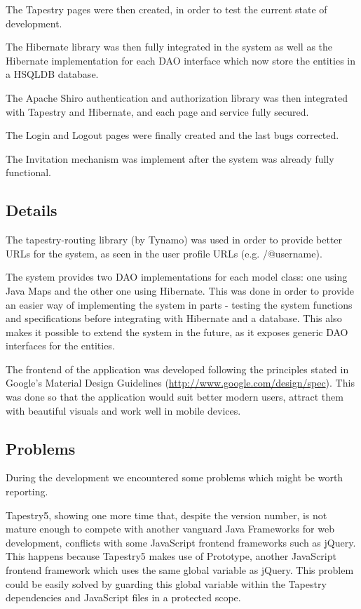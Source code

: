 \documentclass[paper=a4, fontsize=12pt]{scrartcl}
\numberwithin{equation}{section}    %
\numberwithin{figure}{section}      %
\numberwithin{table}{section}        %
\begin{document}
The Tapestry pages were then created, in order to test the current state of development.

The Hibernate library was then fully integrated in the system as well as the Hibernate
implementation for each DAO interface which now store the entities in a HSQLDB database.

The Apache Shiro authentication and authorization library was then integrated with Tapestry and Hibernate,
and each page and service fully secured.

The Login and Logout pages were finally created and the last bugs corrected.

The Invitation mechanism was implement after the system was already fully functional.

\subsection{Details}
The tapestry-routing library (by Tynamo) was used in order to provide better URLs for the system,
as seen in the user profile URLs (e.g. /@username).

The system provides two DAO implementations for each model class: one using Java Maps
and the other one using Hibernate. This was done in order to provide an easier way
of implementing the system in parts - testing the system functions and specifications
before integrating with Hibernate and a database. This also makes it possible to
extend the system in the future, as it exposes generic DAO interfaces for the entities.

The frontend of the application was developed following the principles stated in
Google's Material Design Guidelines (\url{http://www.google.com/design/spec}).
This was done so that the application would suit better modern users, attract them
with beautiful visuals and work well in mobile devices.

\pagebreak

\subsection{Problems}
During the development we encountered some problems which might be worth reporting.

Tapestry5, showing one more time that, despite the version number, is not mature enough
to compete with another vanguard Java Frameworks for web development, conflicts with
some JavaScript frontend frameworks such as jQuery. This happens because Tapestry5 makes
use of Prototype, another JavaScript frontend framework which uses the same global variable
as jQuery. This problem could be easily solved by guarding this global variable within the
Tapestry dependencies and JavaScript files in a protected scope.
\end{document}
